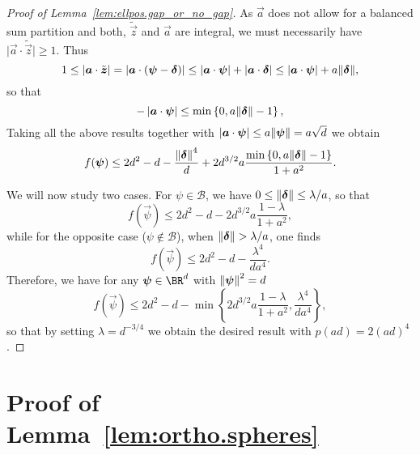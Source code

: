 \begin{proof}[Proof of Lemma~\ref{lem:ellpos.gap_or_no_gap}]
As $\vec a$ does not allow for a balanced sum partition and both, $\tilde{\vec z}$ and $\vec a$ are integral, we must necessarily have $\vert \vec a \cdot \tilde{\vec z} \vert \geq 1$. Thus
\begin{equation}
1\leq\left|\boldsymbol{a}\cdot\tilde{{\boldsymbol{z}}}\right|=\left|\boldsymbol{a}\cdot\left(\boldsymbol{\psi}-\boldsymbol{\delta}\right)\right|\leq\left|\boldsymbol{a}\cdot\boldsymbol{\psi}\right|+\left|\boldsymbol{a}\cdot\boldsymbol{\delta}\right|\leq\left|\boldsymbol{a}\cdot\boldsymbol{\psi}\right|+a{\Vert\boldsymbol{\delta}\Vert},
\end{equation}
so that
\begin{equation}
-\left|\boldsymbol{a}\cdot\boldsymbol{\psi}\right|\leq\min\left\{0,a{\Vert\boldsymbol{\delta}\Vert}-1\right\},
\end{equation}
Taking all the above results together with $\left|\boldsymbol{a}\cdot\boldsymbol{\psi}\right|\leq a{\Vert\boldsymbol{\psi}\Vert}=a\sqrt{d}$ we obtain
\begin{equation}
f({\boldsymbol{\psi}})\leq 2d^{2}-d-\frac{{\Vert{\boldsymbol{\delta}}\Vert}^4}{d}+2 d^{3/2}a\frac{\min\left\{0,a{\Vert\boldsymbol{\delta}\Vert}-1\right\}}{1+a^{2}}.
\end{equation}

We will now study two cases. For $\psi \in \mathcal{B}$, we have $0\leq{\Vert{\boldsymbol{\delta}}\Vert}\leq\lambda/a$, so that
\begin{equation}
f(\vec \psi)\leq 2d^{2}-d-2 d^{3/2}a\frac{1-\lambda}{1+a^{2}},
\end{equation}
while for the opposite case ($\psi \notin \mathcal{B}$), when  ${\Vert{\boldsymbol{\delta}}\Vert}>\lambda/a$, one finds
 \begin{equation}
f(\vec \psi)\leq 2d^{2}-d-\frac{\lambda^4}{d a^4}.
\end{equation}
Therefore, we have for any $\vec\psi \in \BR^d$ with ${\Vert{\boldsymbol{\psi}}\Vert}^2 = d$
\begin{equation}
f(\vec \psi)\leq 2d^{2}-d- \min\left\{2 d^{3/2}a\frac{1-\lambda}{1+a^{2}},\frac{\lambda^4}{d a^4}\right\},
\end{equation}
so that by setting $\lambda=d^{-3/4}$ we obtain the desired result with $p(ad)=2{(ad)}^4$.
\end{proof}




\section{Proof of Lemma~\ref{lem:ortho.spheres}}
\label{sec:spheres}


